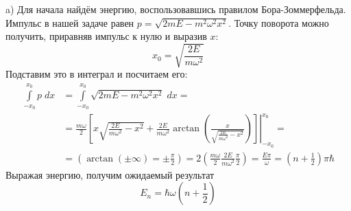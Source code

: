 a) Для начала найдём энергию, воспользовавшись правилом Бора-Зоммерфельда. Импульс в нашей задаче равен $p = \sqrt{2mE - m^2\omega^2x^2}$. Точку поворота можно получить, приравняв импульс к нулю и выразив $x$:
\[
x_0 = \sqrt{\frac{2E}{m\omega^2}}
\]
Подставим это в интеграл и посчитаем его:
\begin{align*}
\int\limits_{-x_0}^{x_0}p\;dx & = \int\limits_{-x_0}^{x_0}\sqrt{2mE - m^2\omega^2x^2}\;dx =\\
& = \left.\frac{m\omega}{2}\left[x\sqrt{\frac{2E}{m\omega^2}- x^2} + \frac{2E}{m\omega^2}\arctan\left( \frac{x}{\sqrt{\frac{2E}{m\omega^2} - x^2}} \right)\right]\right|_{-x_0}^{x_0} = \\ 
& = \left( \arctan(\pm\infty) = \pm\frac{\pi}{2}\right) = 2\left(\frac{m\omega}{2}\frac{2E}{m\omega^2}\frac{\pi}{2}\right) = \frac{E\pi}{\omega} = \left(n + \frac{1}{2}\right)\pi\hbar
\end{align*}
Выражая энергию, получим ожидаемый результат
\[
E_n = \hbar\omega\left(n + \frac{1}{2}\right)
\]

